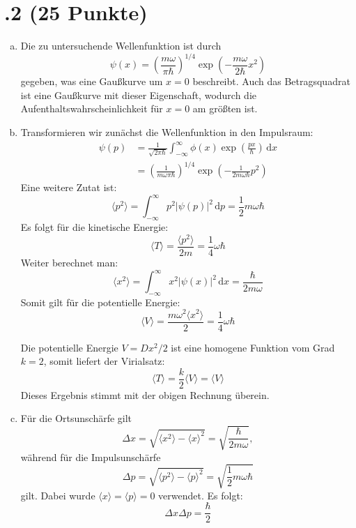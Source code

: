 \section*{\nr.2 \tittwo (25 Punkte)}
\begin{enumerate}[(a)]
\item Die zu untersuchende Wellenfunktion ist durch
\begin{equation}
\psi(x) = \left(\frac{m\omega}{\pi\hbar}\right)^{1/4} \exp\left(-\frac{m\omega}{2\hbar}x^2 \right)
\end{equation}
gegeben, was eine Gaußkurve um $x=0$ beschreibt. Auch das Betragsquadrat ist eine Gaußkurve mit dieser Eigenschaft, wodurch die Aufenthaltswahrscheinlichkeit für $x=0$ am größten ist.
\item
Transformieren wir zunächst die Wellenfunktion in den Impulsraum:
\begin{align}
\psi(p) &= \frac{1}{\sqrt{2\pi\hbar}}\int_{-\infty}^{\infty} {\phi(x)\exp\left(\frac{px}{\hbar} \right)\,\mathrm{d}x}\\
 &= \left(\frac{1}{m\omega\pi\hbar}\right)^{1/4} \exp\left(-\frac{1}{2m\omega\hbar}p^2 \right)
\end{align}
Eine weitere Zutat ist:
\begin{equation}
\langle p^2\rangle = \int_{-\infty}^{\infty} {p^2\left|\psi(p)\right|^2\,\mathrm{d}p} 
= \frac{1}{2}m\omega\hbar
\end{equation}
Es folgt für die kinetische Energie:
\begin{equation}
\langle T \rangle = \frac{\langle p^2\rangle}{2m} = \frac{1}{4} \omega \hbar
\end{equation}
Weiter berechnet man:
\begin{equation}
\langle x^2\rangle = \int_{-\infty}^{\infty} {x^2\left|\psi(x)\right|^2\,\mathrm{d}x} 
= \frac{\hbar}{2m\omega}
\end{equation}
Somit gilt für die potentielle Energie:
\begin{equation}
\langle V \rangle = \frac{m\omega^2\langle x^2\rangle}{2} = \frac{1}{4} \omega \hbar
\end{equation}

Die potentielle Energie $V=Dx^2/2$ ist eine homogene Funktion vom Grad $k=2$, somit liefert der Virialsatz:
\begin{equation}
\langle T \rangle = \frac{k}{2}\langle V \rangle = \langle V \rangle
\end{equation}
Dieses Ergebnis stimmt mit der obigen Rechnung überein.
\item Für die Ortsunschärfe gilt
\begin{equation}
\Delta x = \sqrt{\langle x^2 \rangle - \langle x \rangle^2} = \sqrt{ \frac{\hbar}{2m\omega}},
\end{equation}
während für die Impulsunschärfe
\begin{equation}
\Delta p = \sqrt{\langle p^2 \rangle - \langle p \rangle^2} = \sqrt{\frac{1}{2}m\omega\hbar}
\end{equation}
gilt. Dabei wurde $\langle x \rangle = \langle p \rangle = 0$ verwendet.
Es folgt:
\begin{equation}
\Delta x \Delta p = \frac{\hbar}{2}
\end{equation}
\end{enumerate}